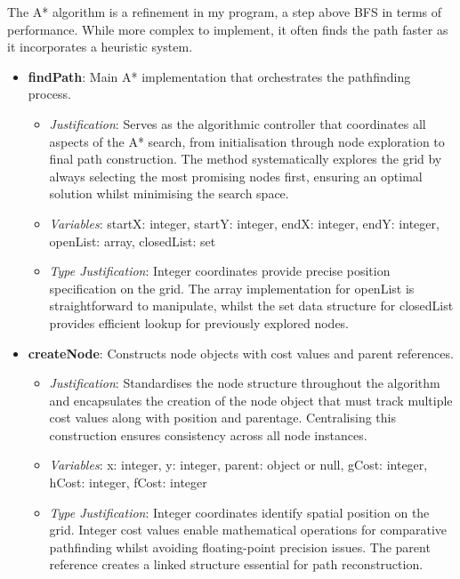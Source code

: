 The A* algorithm is a refinement in my program, a step above BFS in terms of performance. While more complex to implement, it often finds the path faster as it incorporates a heuristic system.

\begin{itemize} \item \textbf{findPath}: Main A* implementation that orchestrates the pathfinding process. \begin{itemize} \item \textit{Justification}: Serves as the algorithmic controller that coordinates all aspects of the A* search, from initialisation through node exploration to final path construction. The method systematically explores the grid by always selecting the most promising nodes first, ensuring an optimal solution whilst minimising the search space. \item \textit{Variables}: startX: integer, startY: integer, endX: integer, endY: integer, openList: array, closedList: set \item \textit{Type Justification}: Integer coordinates provide precise position specification on the grid. The array implementation for openList is straightforward to manipulate, whilst the set data structure for closedList provides efficient lookup for previously explored nodes. \end{itemize}

\item \textbf{createNode}: Constructs node objects with cost values and parent references. \begin{itemize} \item \textit{Justification}: Standardises the node structure throughout the algorithm and encapsulates the creation of the node object that must track multiple cost values along with position and parentage. Centralising this construction ensures consistency across all node instances. \item \textit{Variables}: x: integer, y: integer, parent: object or null, gCost: integer, hCost: integer, fCost: integer \item \textit{Type Justification}: Integer coordinates identify spatial position on the grid. Integer cost values enable mathematical operations for comparative pathfinding whilst avoiding floating-point precision issues. The parent reference creates a linked structure essential for path reconstruction. \end{itemize}


\end{itemize}

